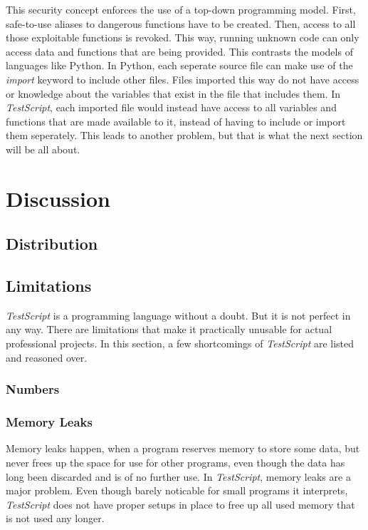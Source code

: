 \documentclass[12pt,a4paper]{article}
\newcommand{\name}{\emph{TestScript}}
\begin{document}
This security concept enforces the use of a top-down programming model. First, safe-to-use aliases
to dangerous functions have to be created. Then, access to all those exploitable functions is
revoked. This way, running unknown code can only access data and functions that are being provided.
This contrasts the models of languages like Python. In Python, each seperate source file can
make use of the \emph{import} keyword to include other files. Files imported this way do not
have access or knowledge about the variables that exist in the file that includes them.
In \name{}, each imported file would instead have access to all variables and functions that
are made available to it, instead of having to include or import them seperately.
This leads to another problem, but that is what the next section will be all about.

\section{Discussion}

\subsection{Distribution}

\subsection{Limitations}
\name{} is a programming language without a doubt. But it is not perfect in any
way. There are limitations that make it practically unusable for actual
professional projects. In this section, a few shortcomings of \name{} are listed
and reasoned over.

\subsubsection{Numbers}

\subsubsection{Memory Leaks}
Memory leaks happen, when a program reserves memory to store some data, but
never frees up the space for use for other programs, even though the data
has long been discarded and is of no further use.
In \name{}, memory leaks are a major problem. Even though barely noticable for small
programs it interprets, \name{} does not have proper setups in place to free up
all used memory that is not used any longer.
\end{document}
